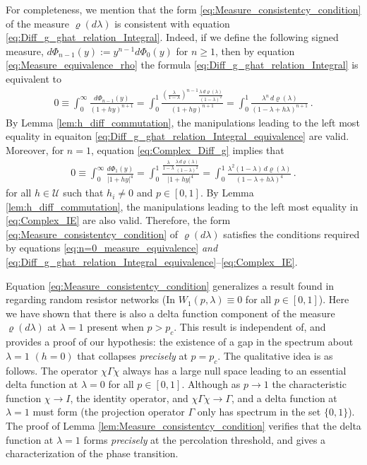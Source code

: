 \documentclass[english,12pt,jmp,graphicx]{revtex4-1}
\begin{document}
For completeness, we mention that the form
\eqref{eq:Measure_consistentcy_condition} of the measure $\varrho(d\lambda)$ is 
consistent with equation
\eqref{eq:Diff_g_ghat_relation_Integral}. Indeed, if we define the
following signed measure,
$d\Phi_{n-1}(y):=y^{n-1}d\Phi_0(y)$ for $n\geq1$, then by equation
\eqref{eq:Measure_equivalence_rho} the formula
\eqref{eq:Diff_g_ghat_relation_Integral} is equivalent to         
%
\begin{align}\label{eq:Diff_g_ghat_relation_Integral_equivalence}  
   0\equiv\int_0^\infty\frac{d\Phi_{n-1}(y)}{(1+hy)^{n+1}}
    =\int_0^1\frac{\left(\frac{\lambda}{1-\lambda}\right)^{n-1}\frac{\lambda\,d\varrho(\lambda)}{(1-\lambda)^2}}
             {(1+hy)^{n+1}}
    =\int_0^1\frac{\lambda^n\,d\varrho(\lambda)}{(1-\lambda+h\lambda)^{n+1}}\,.
\end{align}
%
By Lemma \ref{lem:h_diff_commutation}, the manipulations leading to
the left most equality in equaiton
\eqref{eq:Diff_g_ghat_relation_Integral_equivalence} are 
valid.  Moreover, for $n=1$, equation \eqref{eq:Complex_Diff_g}
implies that
%
\begin{align}\label{eq:Complex_IE} 
  0\equiv\int_0^\infty\frac{d\Phi_1(y)}{|1+hy|^4}=\int_0^1\frac{\frac{\lambda}{1-\lambda}\frac{\lambda\,d\varrho(\lambda)}{(1-\lambda)^2}}
             {|1+hy|^4}
    =\int_0^1\frac{\lambda^2(1-\lambda)\,d\varrho(\lambda)}{(1-\lambda+h\lambda)^4}\,.
\end{align}
%
for all $h\in\mathcal{U}$ such that $h_i\neq0$ and $p\in[0,1]$. By Lemma
\ref{lem:h_diff_commutation}, the manipulations leading to 
the left most equality in \eqref{eq:Complex_IE} are also
valid. Therefore, the form \eqref{eq:Measure_consistentcy_condition} of
$\varrho(d\lambda)$ satisfies the conditions required by equations
\eqref{eq:n=0_measure_equivalence} \emph{and} 
\eqref{eq:Diff_g_ghat_relation_Integral_equivalence}--\eqref{eq:Complex_IE}.

Equation \eqref{eq:Measure_consistentcy_condition} generalizes a
result found in \cite{Day:JPCM-96} regarding random resistor networks
(In \cite{Day:JPCM-96} $W_1(p,\lambda)\equiv0$ for all $p\in[0,1]$). Here we have
shown that there is also a delta function component of the measure
$\varrho(d\lambda)$ at $\lambda=1$ present when $p>p_c$. This result is independent of,
and provides a proof of our hypothesis: the existence of a gap in the
spectrum about $\lambda=1$ $(h=0)$ that collapses \emph{precisely} at
$p=p_c$. The qualitative idea is as follows. The operator $\chi\Gamma\chi$ always
has a large null space leading to an essential delta function at
$\lambda=0$ for all $p\in[0,1]$. Although as $p\to1$ the characteristic function
$\chi\to I$, the identity operator, and $\chi\Gamma\chi\to\Gamma$, and a delta function at
$\lambda=1$ must form (the projection operator $\Gamma$ only has spectrum in the
set $\{0,1\}$). The proof of Lemma
\eqref{lem:Measure_consistentcy_condition} verifies that the delta
function at $\lambda=1$ forms \emph{precisely} at the percolation threshold,
and gives a characterization of the phase transition.  
%
\end{document}
